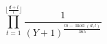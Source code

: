 \documentclass{minimal}
\begin{document}
  \begin{equation*}
\prod_{t=1}^{\lfloor{\frac{d+l}{l}}\rfloor}\frac{1}{(Y+1)^{\frac{m-\operatorname{mod}\left(d,l\right)}{365}}}
  \end{equation*}
\end{document}
